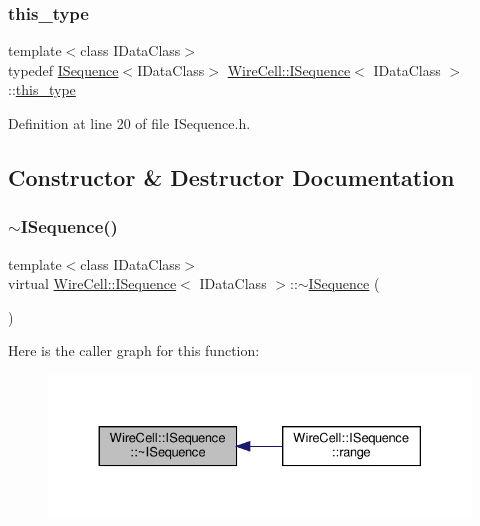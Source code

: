 \subsubsection{\texorpdfstring{this\+\_\+type}{this\_type}}
{\footnotesize\ttfamily template$<$class I\+Data\+Class$>$ \\
typedef \hyperlink{class_wire_cell_1_1_i_sequence}{I\+Sequence}$<$I\+Data\+Class$>$ \hyperlink{class_wire_cell_1_1_i_sequence}{Wire\+Cell\+::\+I\+Sequence}$<$ I\+Data\+Class $>$\+::\hyperlink{class_wire_cell_1_1_i_sequence_aae676a1415a6c843082041fb7f38b963}{this\+\_\+type}}



Definition at line 20 of file I\+Sequence.\+h.



\subsection{Constructor \& Destructor Documentation}
\mbox{\label{class_wire_cell_1_1_i_sequence_a961611c1a2718fd8ac5bfe3120e6e46f}} 
\subsubsection{\texorpdfstring{$\sim$\+I\+Sequence()}{~ISequence()}}
{\footnotesize\ttfamily template$<$class I\+Data\+Class$>$ \\
virtual \hyperlink{class_wire_cell_1_1_i_sequence}{Wire\+Cell\+::\+I\+Sequence}$<$ I\+Data\+Class $>$\+::$\sim$\hyperlink{class_wire_cell_1_1_i_sequence}{I\+Sequence} (\begin{DoxyParamCaption}{ }\end{DoxyParamCaption})\hspace{0.3cm}{\ttfamily [virtual]}}

Here is the caller graph for this function\+:
\nopagebreak
\begin{figure}[H]
\begin{center}
\leavevmode
\includegraphics[width=330pt]{class_wire_cell_1_1_i_sequence_a961611c1a2718fd8ac5bfe3120e6e46f_icgraph}
\end{center}
\end{figure}



